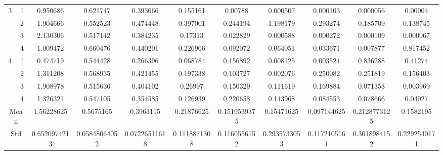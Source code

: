 \documentclass[draft,dvipsnames]{drexel-thesis}
\begin{document}
\begin{thesis}
\begin{table}[!t]
{\begin{tabular}{|c|c|c|c|c|c|c|c|c|c|c|}
\multirow{4}{*}{3}    & 1                   & 0.950686     & 0.621747      & 0.393066      & 0.155161     & 0.00788      & 0.000507     & 0.000103     & 0.000056     & 0.00004      \\ \cline{2-11} 
                      & 2                   & 1.904666     & 0.552523      & 0.474448      & 0.397001     & 0.244194     & 1.198179     & 0.293274     & 0.185709     & 0.138745     \\ \cline{2-11} 
                      & 3                   & 2.130306     & 0.517142      & 0.384235      & 0.17313      & 0.022829     & 0.000588     & 0.000272     & 0.000109     & 0.000067     \\ \cline{2-11} 
                      & 4                   & 1.009472     & 0.660476      & 0.440201      & 0.226966     & 0.092072     & 0.064051     & 0.033671     & 0.007877     & 0.817452     \\ \hline
\multirow{4}{*}{4}    & 1                   & 0.474719     & 0.544428      & 0.266396      & 0.068784     & 0.156892     & 0.008125     & 0.003524     & 0.836288     & 0.41274      \\ \cline{2-11} 
                      & 2                   & 1.311208     & 0.568935      & 0.421455      & 0.197338     & 0.103727     & 0.002076     & 0.250082     & 0.251819     & 0.156403     \\ \cline{2-11} 
                      & 3                   & 1.908978     & 0.515636      & 0.404102      & 0.26997      & 0.150329     & 0.111619     & 0.169884     & 0.071353     & 0.003969     \\ \cline{2-11} 
                      & 4                   & 1.326321     & 0.547105      & 0.354585      & 0.126939     & 0.220658     & 0.143968     & 0.084553     & 0.078666     & 0.04027      \\ \hline
\multicolumn{2}{|c|}{Mean}                  & 1.56228625   & 0.5675165     & 0.3963115     & 0.21876625   & 0.1519539375 & 0.15471625   & 0.097144625  & 0.2128773125 & 0.1582195    \\ \hline
\multicolumn{2}{|c|}{Std}                   & 0.6520974213 & 0.05848064052 & 0.07226511618 & 0.1118871308 & 0.1160556152 & 0.2935733053 & 0.1172105161 & 0.3018984152 & 0.2292540171 \\ \hline
\end{tabular}}
\end{table}


\end{thesis}
\end{document}
